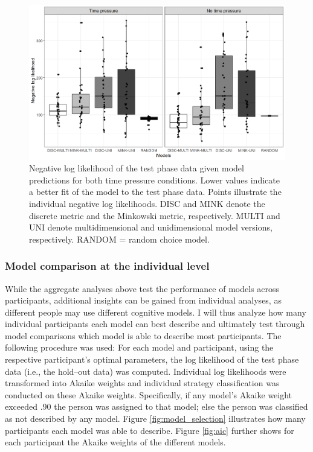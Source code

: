\documentclass[a4paper,man,natbib]{apa6}
\begin{document}
\begin{figure}
\centering
\includegraphics[width = \textwidth]{fig_log_lik.png}
\caption{Negative log likelihood of the test phase data given model predictions for both time pressure conditions. Lower values indicate a better fit of the model to the test phase data. Points illustrate the individual negative log likelihoods. DISC and MINK denote the discrete metric and the Minkowski metric, respectively. MULTI and UNI denote multidimensional and unidimensional model versions, respectively. RANDOM = random choice model.}
\label{fig:log_lik}
\end{figure}

\subsubsection{Model comparison at the individual level} \label{sec:res_ind}
While the aggregate analyses above test the performance of models across participants, additional insights can be gained from individual analyses, as different people may use different cognitive models. I will thus analyze how many individual participants each model can best describe and ultimately test through model comparisons which model is able to describe most participants. 
The following procedure was used: For each model and participant, using the respective participant's optimal parameters, the log likelihood of the test phase data (i.e., the hold--out data) was computed. Individual log likelihoods were transformed into Akaike weights \citep{wagenmakers2004aic} and individual strategy classification was conducted on these Akaike weights. Specifically, if any model’s Akaike weight exceeded .90 the person was assigned to that model; else the person was classified as not described by any model. Figure \ref{fig:model_selection} illustrates how many participants each model was able to describe. Figure \ref{fig:aic} further shows for each participant the Akaike weights of the different models.
\end{document}
